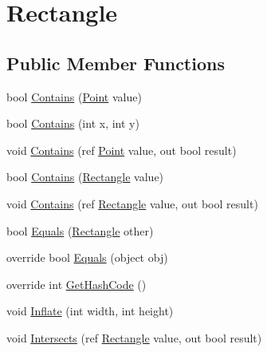 \hypertarget{structMicrosoft_1_1Xna_1_1Framework_1_1Rectangle}{}\section{Rectangle}
\label{structMicrosoft_1_1Xna_1_1Framework_1_1Rectangle}
\subsection*{Public Member Functions}
\begin{DoxyCompactItemize}
\item 
bool \hyperlink{structMicrosoft_1_1Xna_1_1Framework_1_1Rectangle_a3b93c5bd7608f027ddd8d137655e05b4}{Contains} (\hyperlink{structMicrosoft_1_1Xna_1_1Framework_1_1Point}{Point} value)
\item 
bool \hyperlink{structMicrosoft_1_1Xna_1_1Framework_1_1Rectangle_a63b9a4327a337dcdfb1633cee3eac726}{Contains} (int x, int y)
\item 
void \hyperlink{structMicrosoft_1_1Xna_1_1Framework_1_1Rectangle_a8ff5299fec603891d1d9ad16ebfbfbfb}{Contains} (ref \hyperlink{structMicrosoft_1_1Xna_1_1Framework_1_1Point}{Point} value, out bool result)
\item 
bool \hyperlink{structMicrosoft_1_1Xna_1_1Framework_1_1Rectangle_a609f72da1dbffe922c9fef76a92f3f67}{Contains} (\hyperlink{structMicrosoft_1_1Xna_1_1Framework_1_1Rectangle}{Rectangle} value)
\item 
void \hyperlink{structMicrosoft_1_1Xna_1_1Framework_1_1Rectangle_a8c890e83857b827dba008ea4faddebd7}{Contains} (ref \hyperlink{structMicrosoft_1_1Xna_1_1Framework_1_1Rectangle}{Rectangle} value, out bool result)
\item 
bool \hyperlink{structMicrosoft_1_1Xna_1_1Framework_1_1Rectangle_a072012877c22998938de315d51839471}{Equals} (\hyperlink{structMicrosoft_1_1Xna_1_1Framework_1_1Rectangle}{Rectangle} other)
\item 
override bool \hyperlink{structMicrosoft_1_1Xna_1_1Framework_1_1Rectangle_aadf763f0213fc2f3875230b06bb0b6cf}{Equals} (object obj)
\item 
override int \hyperlink{structMicrosoft_1_1Xna_1_1Framework_1_1Rectangle_a77e1afa2b6dee1ed3640da81d7407b42}{Get\+Hash\+Code} ()
\item 
void \hyperlink{structMicrosoft_1_1Xna_1_1Framework_1_1Rectangle_a8d8e2266f2a7d632872ba102f361b487}{Inflate} (int width, int height)
\item 
void \hyperlink{structMicrosoft_1_1Xna_1_1Framework_1_1Rectangle_ae5e2a012a9f8a1c769fd03373e6d87c6}{Intersects} (ref \hyperlink{structMicrosoft_1_1Xna_1_1Framework_1_1Rectangle}{Rectangle} value, out bool result)

\end{DoxyCompactItemize}
